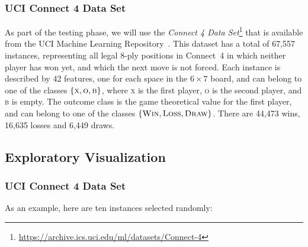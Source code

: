 \documentclass{article}
\begin{document}
\subsubsection{UCI Connect 4 Data Set}

\newcommand{\URLUCI}{\url{https://archive.ics.uci.edu/ml/datasets/Connect-4}}

As part of the testing phase, we will use the \emph{Connect 4 Data Set}\footnote{\URLUCI{}} that is
available from the UCI Machine Learning Repository~\citep{Hettich1998UCI}. This dataset has a total
of 67,557 instances, representing all legal 8-ply positions in \mbox{Connect 4} in which neither
player has won yet, and which the next move is not forced. Each instance is described by 42
features, one for each space in the $6 \times 7$ board, and can belong to one of the classes
$\{\textsc{x}, \textsc{o}, \textsc{b}\}$, where \textsc{x} is the first player, \textsc{o} is the
second player, and \textsc{b} is empty. The outcome class is the game theoretical value for the
first player, and can belong to one of the classes $\{\textsc{Win}, \textsc{Loss}, \textsc{Draw}\}$.
There are 44,473 wins, 16,635 losses and 6,449 draws.

\subsection{Exploratory Visualization}

\subsubsection{UCI Connect 4 Data Set}

As an example, here are ten instances selected randomly:

\end{document}
